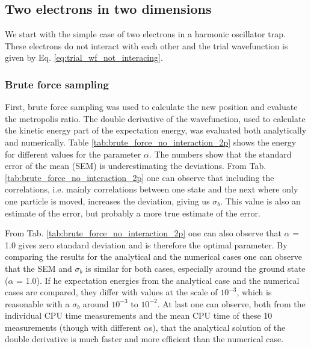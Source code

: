 \subsection{Two electrons in two dimensions}

We start with the simple case of two electrons in a harmonic oscillator trap. These electrons do not interact with each other and the trial wavefunction is given by Eq. \ref{eq:trial_wf_not_interacing}. 

\subsubsection{Brute force sampling}

First, brute force sampling was used to calculate the new position and evaluate the metropolis ratio. The double derivative of the wavefunction, used to calculate the kinetic energy part of the expectation energy, was evaluated both analytically and numerically. Table \ref{tab:brute_force_no_interaction_2p} shows the energy for different values for the parameter $\alpha$. The numbers show that the standard error of the mean (SEM) is underestimating the deviations. From Tab. \ref{tab:brute_force_no_interaction_2p} one can observe that including the correlations, i.e. mainly correlations between one state and the next where only one particle is moved, increases the deviation, giving us $\sigma_b$. This value is also an estimate of the error, but probably a more true estimate of the error.

From Tab. \ref{tab:brute_force_no_interaction_2p} one can also observe that $\alpha $ = 1.0 gives zero standard deviation and is therefore the optimal parameter. By comparing the results for the analytical and the numerical cases one can observe that the SEM and $\sigma_b$ is similar for both cases, especially around the ground state ($\alpha$ = 1.0). If he expectation energies from the analytical case and the numerical cases are compared, they differ with values at the scale of $10^{-3}$, which is reasonable with a $\sigma_b$ around $10^{-3}$ to $10^{-2}$. At last one can observe, both from the individual CPU time measurements and the mean CPU time of these 10 measurements (though with different $\alpha$s), that the analytical solution of the double derivative is much faster and more efficient than the numerical case. 

